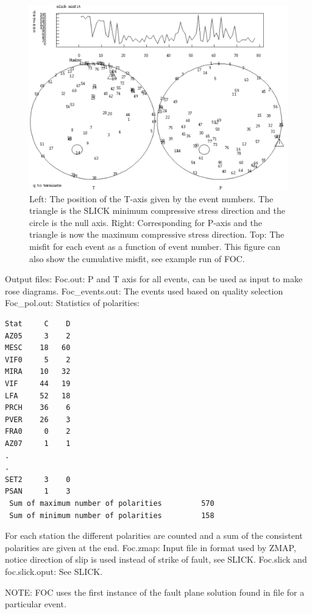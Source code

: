  
\begin{figure}
\centerline{\includegraphics[width=0.9\linewidth]{fig/fps-slick}}
\caption{Left: The position of the T-axis given by the event numbers. The triangle is the SLICK minimum compressive stress direction and the circle is the null axis. Right: Corresponding for P-axis and the triangle is now the maximum compressive stress direction. Top: The misfit for each event as a function of event number. This figure can also show the cumulative misfit, see example run of FOC.}
\label{fig:fps-slick}
\end{figure}


Output files:\newline
Foc.out: P and T axis for all events, can be used as input to make rose diagrams.\newline
Foc\_events.out: The events used based on quality selection\newline
Foc\_pol.out: Statistics of polarities:

\begin{verbatim}
Stat     C    D
AZ05     3    2
MESC    18   60
VIF0     5    2
MIRA    10   32
VIF     44   19
LFA     52   18
PRCH    36    6
PVER    26    3
FRA0     0    2
AZ07     1    1
.
.
SET2     3    0
PSAN     1    3
 Sum of maximum number of polarities         570
 Sum of minimum number of polarities         158
\end{verbatim}

For each station the different polarities are counted and a sum of the consistent polarities are given at the end.
Foc.zmap: Input file in format used by ZMAP, notice direction of slip is used instead of strike of fault, see SLICK.\newline
Foc.slick and foc.slick.oput: See SLICK.

NOTE: FOC uses the first instance of the fault plane solution found in file for a particular event.

